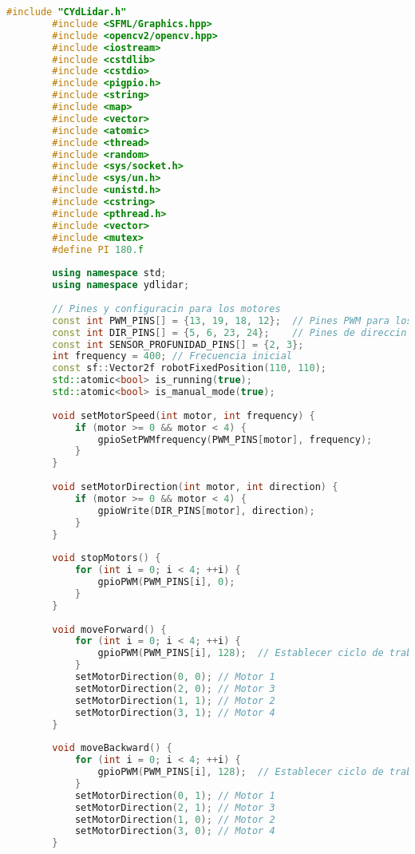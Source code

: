       \begin{lstlisting}[language={C++}, caption={Primer ajuste de c\'odigo}, label={Script}]
        #include "CYdLidar.h"
        #include <SFML/Graphics.hpp>
        #include <opencv2/opencv.hpp>
        #include <iostream>
        #include <cstdlib>
        #include <cstdio>
        #include <pigpio.h>
        #include <string>
        #include <map>
        #include <vector>
        #include <atomic>
        #include <thread>
        #include <random>
        #include <sys/socket.h>
        #include <sys/un.h>
        #include <unistd.h>
        #include <cstring>
        #include <pthread.h>
        #include <vector>
        #include <mutex>
        #define PI 180.f
        
        using namespace std;
        using namespace ydlidar;
        
        // Pines y configuracin para los motores
        const int PWM_PINS[] = {13, 19, 18, 12};  // Pines PWM para los motores
        const int DIR_PINS[] = {5, 6, 23, 24};    // Pines de direccin para los motores
        const int SENSOR_PROFUNIDAD_PINS[] = {2, 3};
        int frequency = 400; // Frecuencia inicial
        const sf::Vector2f robotFixedPosition(110, 110);
        std::atomic<bool> is_running(true);
        std::atomic<bool> is_manual_mode(true);
        
        void setMotorSpeed(int motor, int frequency) {
            if (motor >= 0 && motor < 4) {
                gpioSetPWMfrequency(PWM_PINS[motor], frequency);
            }
        }
        
        void setMotorDirection(int motor, int direction) {
            if (motor >= 0 && motor < 4) {
                gpioWrite(DIR_PINS[motor], direction);
            }
        }
        
        void stopMotors() {
            for (int i = 0; i < 4; ++i) {
                gpioPWM(PWM_PINS[i], 0);
            }
        }
        
        void moveForward() {
            for (int i = 0; i < 4; ++i) {
                gpioPWM(PWM_PINS[i], 128);  // Establecer ciclo de trabajo al 50%
            }
            setMotorDirection(0, 0); // Motor 1
            setMotorDirection(2, 0); // Motor 3
            setMotorDirection(1, 1); // Motor 2
            setMotorDirection(3, 1); // Motor 4
        }
        
        void moveBackward() {
            for (int i = 0; i < 4; ++i) {
                gpioPWM(PWM_PINS[i], 128);  // Establecer ciclo de trabajo al 50%
            }
            setMotorDirection(0, 1); // Motor 1
            setMotorDirection(2, 1); // Motor 3
            setMotorDirection(1, 0); // Motor 2
            setMotorDirection(3, 0); // Motor 4
        }
        

\end{lstlisting}
